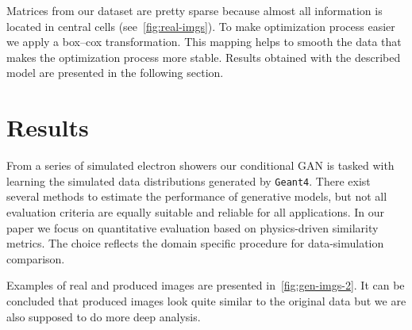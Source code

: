 \documentclass{webofc}
\newcommand{\geant}{{\texttt{Geant4}}}
\begin{document}
Matrices from our dataset are pretty sparse because almost all information is located in central cells (see~\cref{fig:real-imgs}). To make optimization process easier we apply a box--cox transformation. This mapping helps to smooth the data that makes the optimization process more stable.
Results obtained with the described model are presented in the following section.

\section{Results}
From a series of simulated electron showers our conditional GAN is tasked with learning the simulated data distributions generated by \geant. There exist several methods to estimate the performance of generative models, but not all evaluation criteria are equally suitable and reliable for all applications. In our paper we focus on quantitative evaluation based on physics-driven similarity metrics. The choice reflects the domain specific procedure for data-simulation comparison. 

Examples of real and produced images are presented in~\cref{fig:gen-imgs-2}. It can be concluded that produced images look quite similar to the original data but we are also supposed to do more deep analysis.
\end{document}
